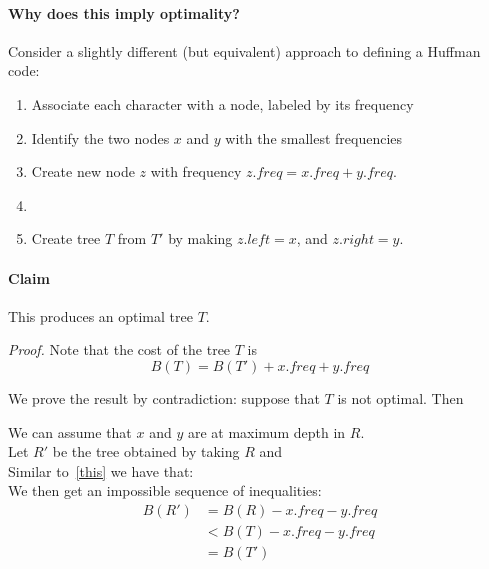 \documentclass[11  pt]{article}
\begin{document}
\newpage 
\paragraph{Why does this imply optimality?}
Consider a slightly different (but equivalent) approach to defining a Huffman code:
\begin{enumerate}
\item Associate each character with a node, labeled by its frequency
\item Identify the two nodes $x$ and $y$ with the smallest frequencies
\item Create new node $z$ with frequency $z.freq = x.freq + y.freq$. 
\item  %
\item Create tree $T$ from $T'$ by making $z.left = x$, and $z.right = y$.
\end{enumerate}

\paragraph{Claim}
This produces an optimal tree $T$. 

\textit{Proof.}
Note that the cost of the tree $T$ is 
\begin{equation}
\label{this}
B(T) = B(T') + x.freq + y.freq
\end{equation}

\vs{2cm}


We prove the result by contradiction: suppose that $T$ is not optimal. Then %


\vs{2cm}

We can assume that $x$ and $y$ are at maximum depth in $R$. \\

%	
Let $R'$ be the tree obtained by taking $R$ and \\ %

Similar to~\eqref{this} we have that:  \\


We then get an impossible sequence of inequalities:
\begin{align*}
B(R') &= B(R) - x.freq - y.freq \\
& < B(T) - x.freq - y.freq \\
& = B(T') 
\end{align*}

\end{document}
